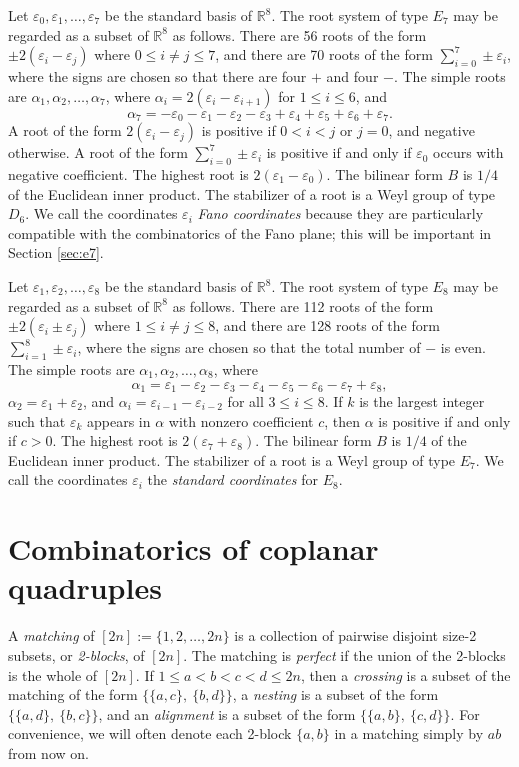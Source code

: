 \documentclass[11pt]{amsart}
\theoremstyle{plain}
\theoremstyle{definition}
\theoremstyle{remark}
\numberwithin{equation}{subsection}
\newcommand{\al}{\alpha}
\newcommand{\ep}{\varepsilon}
\newcommand{\R}{{\mathbb R}}
\begin{document}
Let $\ep_0, \ep_1, \ldots, \ep_7$ be the standard basis of $\R^8$. The root
system of type $E_7$ may be regarded as a subset of $\R^8$ as follows.  There
are 56 roots of the form $\pm 2(\ep_i - \ep_j)$ where $0 \leq i \ne j \leq 7$,
and there are 70 roots of the form $\sum_{i = 0}^7 \pm \ep_i$, where the signs
are chosen so that there are four $+$ and four $-$. The simple roots are $\al_1,
\al_2, \ldots, \al_7$, where $\al_i = 2(\ep_i - \ep_{i+1})$ for $1 \leq i \leq
6$, and $$ \al_7 = - \ep_0 - \ep_1 - \ep_2 - \ep_3 + \ep_4 + \ep_5 + \ep_6 +
\ep_7 .$$ A root of the form $2(\ep_i - \ep_j)$ is positive if $0 < i < j$ or $j
= 0$, and negative otherwise. A root of the form $\sum_{i = 0}^7 \pm \ep_i$ is
positive if and only if $\ep_0$ occurs with negative coefficient. The highest
root is $2(\ep_1 - \ep_0)$.  The bilinear form $B$ is $1/4$ of the Euclidean
inner 
product.  The stabilizer of a root is a Weyl group of type $D_6$. We call the
coordinates $\ep_i$ {\it Fano coordinates} because they are particularly
compatible with the combinatorics of the Fano plane; this will be important in
Section \ref{sec:e7}.

Let $\ep_1, \ep_2, \ldots, \ep_8$ be the standard basis of $\R^8$. The root
system of type $E_8$ may be regarded as a subset of $\R^8$ as follows.  There
are 112 roots of the form $\pm 2(\ep_i \pm \ep_j)$ where $1 \leq i \ne j \leq
8$, and there are 128 roots of the form $\sum_{i = 1}^8 \pm \ep_i$, where the
signs are chosen so that the total number of $-$ is even. The simple roots are
$\al_1, \al_2, \ldots, \al_8$, where $$ \al_1 = \ep_1 - \ep_2 - \ep_3 - \ep_4 -
\ep_5 - \ep_6 - \ep_7 + \ep_8 ,$$ $\al_2 = \ep_1 + \ep_2$, and $\al_i =
\ep_{i-1} - \ep_{i-2}$ for all $3 \leq i \leq 8$. If $k$ is the largest integer
such that $\ep_k$ appears in $\al$ with nonzero coefficient $c$, then $\al$ is
positive if and only if $c > 0$. The highest root is $2(\ep_7 + \ep_8)$.  The
bilinear form $B$ is $1/4$ of the Euclidean inner product.  The stabilizer of a root
is a Weyl group of type $E_7$. We call the coordinates $\ep_i$ the {\it standard
coordinates} for $E_8$.

\section{Combinatorics of coplanar quadruples}\label{sec:crossnest}

A {\it matching} of $[2n] := \{1, 2, \ldots, 2n\}$ is a collection of pairwise
disjoint size-2 subsets, or \emph{2-blocks}, of $[2n]$. The matching is {\it
perfect} if the union of the 2-blocks is the whole of $[2n]$.  If $1 \leq a < b
< c < d \leq 2n$, then a {\it crossing} is a subset of the matching of the form
$\{\{a, c\}, \ \{b, d\}\}$, a {\it nesting} is a subset of the form $\{\{a, d\},
\ \{b, c\}\}$, and an {\it alignment} is a subset of the form $\{\{a, b\}, \
\{c, d\}\}$.  For convenience, we will often denote each 2-block  $\{a,b\}$ in a
matching simply by $ab$ from now on.
\end{document}
